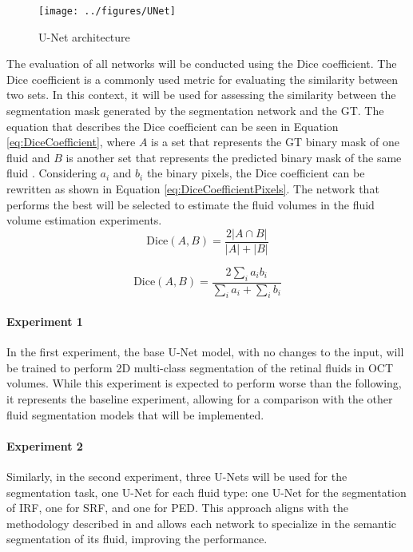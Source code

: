\begin{figure}[!ht]
	\centering
	\texttt{[image: ../figures/UNet]}
	\caption{U-Net architecture \cite{Ronneberger2015}}
	\label{fig:UNet}
\end{figure}

\par
The evaluation of all networks will be conducted using the Dice coefficient. The Dice coefficient is a commonly used metric for evaluating the similarity between two sets. In this context, it will be used for assessing the similarity between the segmentation mask generated by the segmentation network and the GT. The equation that describes the Dice coefficient can be seen in Equation \ref{eq:DiceCoefficient}, where $A$ is a set that represents the GT binary mask of one fluid and $B$ is another set that represents the predicted binary mask of the same fluid \cite{Shamir2019}. Considering $a_{i}$ and $b_{i}$ the binary pixels, the Dice coefficient can be rewritten as shown in Equation \ref{eq:DiceCoefficientPixels}. The network that performs the best will be selected to estimate the fluid volumes in the fluid volume estimation experiments.
\begin{equation}
	\text{Dice}(A, B) = \frac{2|A \cap B|}{|A| + |B|}
	\label{eq:DiceCoefficient}
\end{equation}

\begin{equation}
	\text{Dice}(A, B) = \frac{2\sum_{i} a_{i} b_{i}}{\sum_{i} a_{i} + \sum_{i} b_{i}}
	\label{eq:DiceCoefficientPixels}
\end{equation}

\paragraph{Experiment 1}
In the first experiment, the base U-Net model, with no changes to the input, will be trained to perform 2D multi-class segmentation of the retinal fluids in OCT volumes. While this experiment is expected to perform worse than the following, it represents the baseline experiment, allowing for a comparison with the other fluid segmentation models that will be implemented.

\paragraph{Experiment 2}
Similarly, in the second experiment, three U-Nets will be used for the segmentation task, one U-Net for each fluid type: one U-Net for the segmentation of IRF, one for SRF, and one for PED. This approach aligns with the methodology described in \textcite{Rahil2023, Padilla2022} and allows each network to specialize in the semantic segmentation of its fluid, improving the performance.

